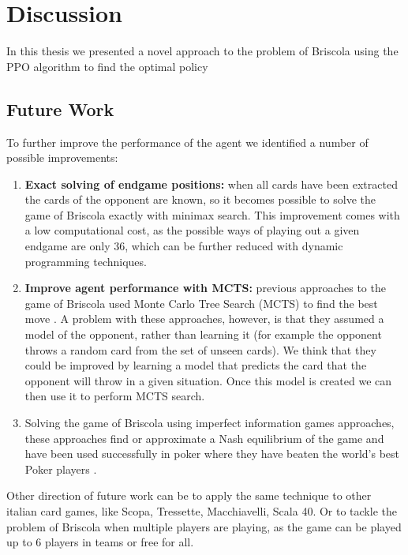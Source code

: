 \chapter{Discussion}
In this thesis we presented a novel approach to the problem of Briscola using the PPO algorithm to find the optimal policy


\section{Future Work}
To further improve the performance of the agent we identified a number of possible improvements:
\begin{enumerate}
    \item \textbf{Exact solving of endgame positions:} when all cards have been extracted the cards of the opponent are known, so it becomes possible to solve the game of Briscola exactly with minimax search. This improvement comes with a low computational cost, as the possible ways of playing out a given endgame are only 36, which can be further reduced with dynamic programming techniques.
    \item \textbf{Improve agent performance with MCTS:} previous approaches to the game of Briscola used Monte Carlo Tree Search (MCTS) to find the best move \cite{Briscola-mcts-Playing-Algorithm, villa2013-briscola-mcts}. A problem with these approaches, however, is that they assumed a model of the opponent, rather than learning it (for example the opponent throws a random card from the set of unseen cards). We think that they could be improved by learning a model that predicts the card that the opponent will throw in a given situation. Once this model is created we can then use it to perform MCTS search.
    \item Solving the game of Briscola using imperfect information games approaches, these approaches find or approximate a Nash equilibrium of the game and have been used successfully in poker where they have beaten the world's best Poker players \cite{libratus}.
\end{enumerate}

Other direction of future work can be to apply the same technique to other italian card games, like Scopa, Tressette, Macchiavelli, Scala 40. Or to tackle the problem of Briscola when multiple players are playing, as the game can be played up to 6 players in teams or free for all.

